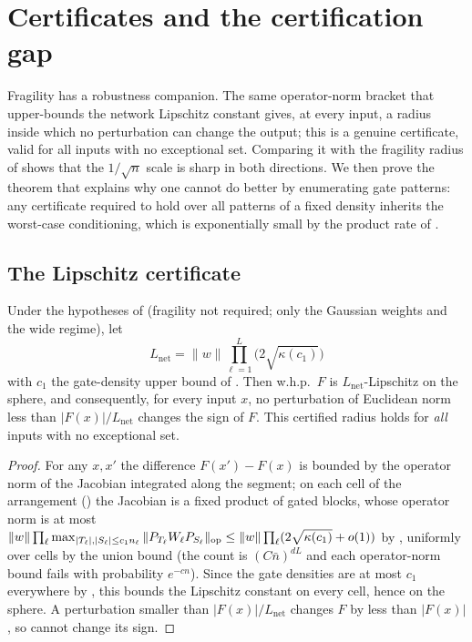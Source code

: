 \section{Certificates and the certification gap}\label{sec:certificates}

Fragility has a robustness companion. The same operator-norm bracket that upper-bounds the network
Lipschitz constant gives, at every input, a radius inside which no perturbation can change the
output; this is a genuine certificate, valid for all inputs with no exceptional set. Comparing it with
the fragility radius of  shows that the $1/\sqrt n$ scale is sharp in both
directions. We then prove the theorem that explains why one cannot do better by enumerating gate
patterns: any certificate required to hold over all patterns of a fixed density inherits the
worst-case conditioning, which is exponentially small by the product rate of .

\subsection{The Lipschitz certificate}
\begin{theorem}\label{thm:certificate}
Under the hypotheses of  (fragility not required; only the Gaussian weights and the
wide regime), let
\[
  L_{\mathrm{net}}=\|w\|\prod_{\ell=1}^L\bigl(2\sqrt{\kappa(c_1)}\bigr)
\]
with $c_1$ the gate-density upper bound of . Then w.h.p.\ $F$ is
$L_{\mathrm{net}}$-Lipschitz on the sphere, and consequently, for every input $x$, no perturbation of
Euclidean norm less than $|F(x)|/L_{\mathrm{net}}$ changes the sign of $F$. This certified radius holds
for \emph{all} inputs with no exceptional set.
\end{theorem}

\begin{proof}
For any $x,x'$ the difference $F(x')-F(x)$ is bounded by the operator norm of the Jacobian integrated
along the segment; on each cell of the arrangement () the Jacobian is a fixed
product of gated blocks, whose operator norm is at most
$\|w\|\prod_\ell\max_{|T_\ell|,|S_\ell|\le c_1 n_\ell}\|P_{T_\ell}W_\ell P_{S_\ell}\|_{\mathrm{op}}\le
\|w\|\prod_\ell(2\sqrt{\kappa(c_1)}+o(1))$ by , uniformly over cells by the union bound
(the count is $(C\bar n)^{dL}$ and each operator-norm bound fails with probability $e^{-cn}$). Since
the gate densities are at most $c_1$ everywhere by , this bounds the Lipschitz
constant on every cell, hence on the sphere. A perturbation smaller than $|F(x)|/L_{\mathrm{net}}$
changes $F$ by less than $|F(x)|$, so cannot change its sign.
\end{proof}

